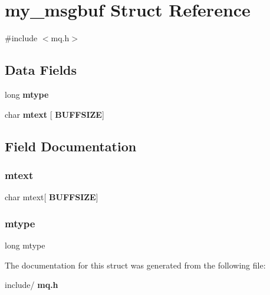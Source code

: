 \section{my\+\_\+msgbuf Struct Reference}
\label{structmy__msgbuf}


{\ttfamily \#include $<$mq.\+h$>$}

\subsection*{Data Fields}
\begin{DoxyCompactItemize}
\item 
long \textbf{ mtype}
\item 
char \textbf{ mtext} [\textbf{ B\+U\+F\+F\+S\+I\+ZE}]
\end{DoxyCompactItemize}


\subsection{Field Documentation}
\mbox{\label{structmy__msgbuf_a08fee1c15ded91acf2b246258fce5d9b}} 
\subsubsection{mtext}
{\footnotesize\ttfamily char mtext[\textbf{ B\+U\+F\+F\+S\+I\+ZE}]}

\mbox{\label{structmy__msgbuf_a6e71692f0e74d6cd516fa62386afcfb4}} 
\subsubsection{mtype}
{\footnotesize\ttfamily long mtype}



The documentation for this struct was generated from the following file\+:\begin{DoxyCompactItemize}
\item 
include/\textbf{ mq.\+h}\end{DoxyCompactItemize}
